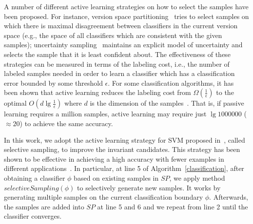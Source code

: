 A number of different active learning strategies on how to select the samples have been proposed. For instance, version space partitioning~\cite{DBLP:conf/icml/RuffD89} tries to select samples on which there is maximal disagreement between classifiers in the current version space (e.g., the space of all classifiers which are consistent with the given samples); uncertainty sampling~\cite{DBLP:conf/sigir/LewisG94} maintains an explicit model of uncertainty and selects the sample that it is least confident about. The effectiveness of these strategies can be measured in terms of the labeling cost, i.e., the number of labeled samples needed in order to learn a classifier which has a classification error bounded by some threshold $\epsilon$. For some classification algorithms, it has been shown that active learning reduces the labeling cost from $\Omega(\frac{1}{\epsilon})$ to the optimal $O(d\lg\frac{1}{\epsilon})$ where $d$ is the dimension of the samples~\cite{DBLP:conf/nips/Gilad-BachrachNT05,DBLP:conf/nips/Dasgupta05}. That is, if passive learning requires a million samples, active learning may require just $\lg 1000000$ ($\approx 20$) to achieve the same accuracy.

In this work, we adopt the active learning strategy for SVM proposed in~\cite{DBLP:conf/icml/SchohnC00}, called selective sampling, to improve the invariant candidates. This strategy has been shown to be effective in achieving a high accuracy with fewer examples in different applications~\cite{DBLP:conf/mm/TongC01,DBLP:journals/jmlr/TongK01}. In particular,
at line 5 of Algorithm~\ref{classification}, after obtaining a classifier $\phi$ based on existing samples in $SP$, we apply method $selectiveSampling(\phi)$ to selectively generate new samples. It works by generating multiple samples on the current classification boundary $\phi$. Afterwards, the samples are added into $SP$ at line 5 and 6 and we repeat from line 2 until the classifier converges.
%

